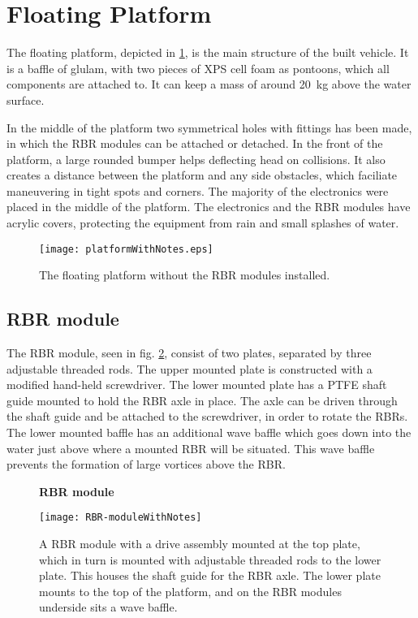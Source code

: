\section{Floating Platform}
The floating platform, depicted in
\cref{fig:floatingPlatform}, is the main structure of the built vehicle.
It is a baffle of glulam, with two pieces of XPS cell foam as
pontoons, which all components are attached to. It can keep a mass of
around 20~kg above the water surface.%

In the middle of the platform two symmetrical holes with fittings has
been made, in which the RBR modules can be attached or detached. In the front of the platform, a large rounded bumper helps deflecting head on collisions. It also creates a distance between the platform and
any side obstacles, which faciliate maneuvering in tight spots and corners. The majority of the electronics were placed in the middle of the platform. The electronics and the RBR modules have acrylic
covers, protecting the equipment from rain and small splashes of water.

\begin{figure}[h]
   \centering
   \texttt{[image: platformWithNotes.eps]}
   \caption{The floating platform without the RBR modules installed.}
   \label{fig:floatingPlatform}
\end{figure}

\subsection{RBR module}
The RBR module, seen in fig. \ref{fig:rbr-module}, consist of two plates, separated by three adjustable threaded
rods. The upper mounted plate is constructed with a modified hand-held screwdriver. The lower mounted
plate has a PTFE shaft guide mounted to hold the RBR axle in place. The axle can be driven through the shaft guide and be attached to the screwdriver, in order to rotate the RBRs. The lower mounted baffle has an
additional wave baffle which goes down into the water just above where a mounted RBR
will be situated. This wave baffle prevents the formation of large vortices above the RBR. 

\begin{figure}[H]
  \centering
  \textbf{RBR module}
  \par\medskip
  \texttt{[image: RBR-moduleWithNotes]}
  \caption{A RBR module with a drive assembly mounted at the top plate,
    which in turn is mounted with adjustable threaded rods to the lower plate. This houses the shaft guide for the RBR axle. The lower plate mounts to the
    top of the platform, and on the RBR modules underside sits a wave baffle.}\label{fig:rbr-module}
\end{figure}

